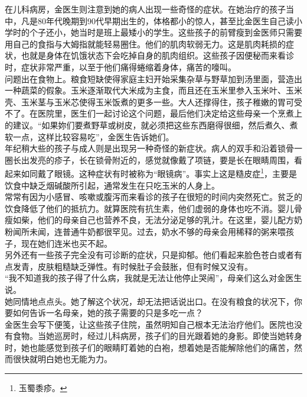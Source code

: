 在儿科病房，金医生则注意到她的病人出现一些奇怪的症状。在她治疗的孩子当中，凡是80年代晚期到90代早期出生的，体格都小的惊人，甚至比金医生自己读小学时的个子还小，她当时是班上最矮小的学生。这些孩子的前臂瘦到金医师只需要用自己的食指与大姆指就能轻易圈住。他们的肌肉软弱无力。这是肌肉耗损的症状，也就是身体在饥饿状态下会吃掉自身的肌肉组织。这些孩子因便秘而来看诊时，症状非常严重，以至于他们痛得蜷缩着身体，痛苦的嚎叫。\\

问题出在食物上。粮食短缺使得家庭主妇开始采集杂草与野草加到汤里面，营造出一种蔬菜的假象。玉米逐渐取代大米成为主食，而且还在玉米里参入玉米叶、玉米壳、玉米茎与玉米芯使得玉米饭煮的更多一些。大人还撑得住，孩子稚嫩的胃可受不了。在医院里，医生们一起讨论这个问题，最后他们决定给这些母亲一个烹煮上的建议。“如果妳们要煮野草或树皮，就必须把这些东西磨得很细，然后煮久、煮软一点，这样比较容易吃”，金医生告诉她们。\\

年纪稍大些的孩子与成人则是出现另一种奇怪的新症状。病人的双手和沿着锁骨一圈长出发亮的疹子，长在锁骨附近的，感觉就像戴了项链，要是长在眼睛周围，看起来如同戴了眼镜。这种症状有时被称为“眼镜病”。事实上这是糙皮症\footnote{玉蜀黍疹。}，主要是饮食中缺乏烟碱酸所引起，通常发生在只吃玉米的人身上。\\

常常有因为小感冒、咳嗽或腹泻而来看诊的孩子在很短的时间内突然死亡。贫乏的饮食降低了他们的抵抗力。就算医院有抗生素，他们虚弱的身体也吃不消。婴儿骨瘦如柴，他们的母亲自己也营养不良，无法分泌足够的乳汁。在这里，婴儿配方奶粉闻所未闻，连普通牛奶都很罕见。过去，奶水不够的母亲会用稀释的粥来喂孩子，现在她们连米也买不起。\\

另外还有一些孩子完全没有可诊断的症状，只是抑郁。他们看起来脸色苍白或者有点发青，皮肤粗糙缺乏弹性。有时候肚子会鼓胀，但有时候又没有。\\

“我不知道我的孩子得了什么病，我就是无法让他停止哭闹”，母亲们这么对金医生说。\\

她同情地点点头。她了解这个状况，却无法把话说出口。在没有粮食的状况下，你要如何告诉一名母亲，她的孩子需要的只是多吃一点？\\

金医生会写下便笺，让这些孩子住院，虽然明知自己根本无法治疗他们。医院也没有食物。当她巡房时，经过儿科病房，孩子们的目光跟着她的身影。即使当她转身时，她也能感觉到孩子们的眼睛盯着她的白袍，想着她是否能解除他们的痛苦，然而很快就明白她也无能为力。\\

